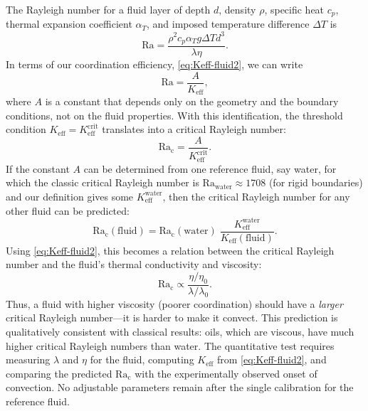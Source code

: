\documentclass[12pt,a4paper]{article}
\begin{document}
	The Rayleigh number for a fluid layer of depth \(d\), density \(\rho\), specific heat \(c_p\), thermal expansion coefficient \(\alpha_T\), and imposed temperature difference \(\Delta T\) is
	\begin{equation}
		\mathrm{Ra} = \frac{\rho^2 c_p \alpha_T g \Delta T d^3}{\lambda \eta}.
	\end{equation}
	In terms of our coordination efficiency, \eqref{eq:Keff-fluid2}, we can write
	\begin{equation}
		\mathrm{Ra} = \frac{A}{K_{\mathrm{eff}}},
	\end{equation}
	where \(A\) is a constant that depends only on the geometry and the boundary conditions, not on the fluid properties.  With this identification, the threshold condition \(K_{\mathrm{eff}} = K_{\mathrm{eff}}^{\mathrm{crit}}\) translates into a critical Rayleigh number:
	\begin{equation}\label{eq:Racrit}
		\mathrm{Ra_c} = \frac{A}{K_{\mathrm{eff}}^{\mathrm{crit}}}.
	\end{equation}
	If the constant \(A\) can be determined from one reference fluid, say water, for which the classic critical Rayleigh number is \(\mathrm{Ra}_{\mathrm{water}} \approx 1708\) (for rigid boundaries) and our definition gives some \(K_{\mathrm{eff}}^{\mathrm{water}}\), then the critical Rayleigh number for any other fluid can be predicted:
	\begin{equation}\label{eq:Racrit-predict}
		\boxed{ \mathrm{Ra_c}(\text{fluid}) = \mathrm{Ra_c}(\text{water}) \;
			\frac{K_{\mathrm{eff}}^{\mathrm{water}}}{K_{\mathrm{eff}}(\text{fluid})} }.
	\end{equation}
	Using \eqref{eq:Keff-fluid2}, this becomes a relation between the critical Rayleigh number and the fluid's thermal conductivity and viscosity:
	\begin{equation}
		\mathrm{Ra_c} \propto \frac{\eta / \eta_0}{\lambda / \lambda_0}.
	\end{equation}
	Thus, a fluid with higher viscosity (poorer coordination) should have a \emph{larger} critical Rayleigh number—it is harder to make it convect.  This prediction is qualitatively consistent with classical results: oils, which are viscous, have much higher critical Rayleigh numbers than water.  The quantitative test requires measuring \(\lambda\) and \(\eta\) for the fluid, computing \(K_{\mathrm{eff}}\) from \eqref{eq:Keff-fluid2}, and comparing the predicted \(\mathrm{Ra_c}\) with the experimentally observed onset of convection.  No adjustable parameters remain after the single calibration for the reference fluid.
	
\end{document}
